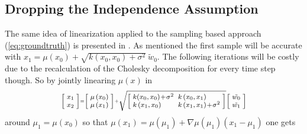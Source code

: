     \subsection{Dropping the Independence Assumption}
            The same idea of linearization applied to the sampling based approach (\ref{eq:groundtruth}) is presented in \cite{Paper4:TrajecotryPrediction_Taylorexpansion}. As mentioned the first sample will be accurate with $ x_{1}=\mu\left(x_{0}\right)+\sqrt{k\left(x_{0}, x_{0}\right)+\sigma^2} \  \tilde{w}_{0} $. The following iterations will be costly due to the recalculation of the Cholesky decomposition for every time step though. So by jointly linearing $\mu(x)$ in
        \begin{equation}
        \label{twostepsgroundtruth}
        \footnotesize
        \setlength{\arraycolsep}{2.5pt}
        \medmuskip = 1mu %
        \centering
            \scriptscriptstyle
            \left[\begin{array}{c}
            x_{1} \\
            x_{2}
            \end{array}\right] = \left[\begin{array}{c}
            \mu\left(x_{0}\right) \\
            \mu\left(x_{1}\right)
            \end{array}\right] + \sqrt{
            \left[\begin{array}{ll}k(x_0, x_0) + \sigma ^2 & k\left(x_0, x_1\right) \\ k\left(x_1, x_0\right) & k\left(x_1, x_1\right)+\sigma ^2\end{array}\right]}
            \left[\begin{array}{c}
            \tilde{w_0} \\
            \tilde{w_1}
            \end{array}\right]
        \end{equation}
        around $\mu_1 = \mu(x_0)$ so that $\mu(x_1) = \mu(\mu_1) + \nabla \mu(\mu_1)(x_1-\mu_1)$ one gets
